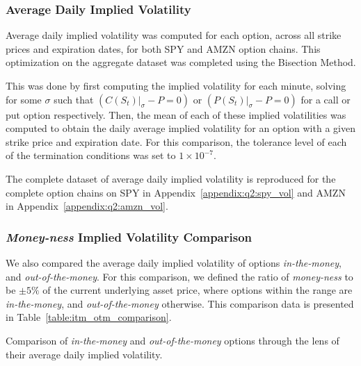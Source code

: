 \documentclass[10pt]{article}
\begin{document}
        \subsubsection{Average Daily Implied Volatility}
        
        Average daily implied volatility was computed for each option, across all strike prices and expiration dates, for both SPY and AMZN option chains. This optimization on the aggregate dataset was completed using the Bisection Method.
        
        This was done by first computing the implied volatility for each minute, solving for some $\sigma$ such that ${(C(S_t) |_{\sigma} - P = 0)}$ or ${(P(S_t) |_{\sigma} - P = 0)}$ for a call or put option respectively. Then, the mean of each of these implied volatilities was computed to obtain the daily average implied volatility for an option with a given strike price and expiration date. For this comparison, the tolerance level of each of the termination conditions was set to $1 \times 10^{-7}$.

        The complete dataset of average daily implied volatility is reproduced for the complete option chains on SPY in Appendix~\ref{appendix:q2:spy_vol} and AMZN in Appendix~\ref{appendix:q2:amzn_vol}.


        \subsubsection{\textit{Money-ness} Implied Volatility Comparison}

        We also compared the average daily implied volatility of options \textit{in-the-money}, and \textit{out-of-the-money}. For this comparison, we defined the ratio of \textit{money-ness} to be $\pm5\%$ of the current underlying asset price, where options within the range are \textit{in-the-money}, and \textit{out-of-the-money} otherwise. This comparison data is presented in Table~\ref{table:itm_otm_comparison}.

        \begin{table}[h]
            \centering
            \caption{Comparison of \textit{in-the-money} and \textit{out-of-the-money} options through the lens of their average daily implied volatility.}
            \label{table:itm_otm_comparison}
        \end{table}
\end{document}
